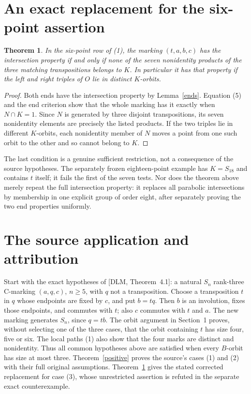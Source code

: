 \documentclass[a4paper,11pt]{article}
\newtheorem{theorem}{Theorem}\newtheorem{lemma}[theorem]{Lemma}
\begin{document}
\section{An exact replacement for the six-point assertion}
\begin{theorem}\label{six}
In the six-point row of (1), the marking $(t,a,b,c)$ has the
intersection property if and only if none of the seven nonidentity
products of the three matching transpositions belongs to $K$.
In particular it has that property if the left and right triples of $O$
lie in distinct $K$-orbits.
\end{theorem}
\begin{proof}
Both ends have the intersection property by Lemma~\ref{ends}.
Equation (5) and the end criterion show that the whole marking has it
exactly when $N\cap K=1$. Since $N$ is generated by three disjoint
transpositions, its seven nonidentity elements are precisely the listed
products. If the two triples lie in different $K$-orbits, each nonidentity
member of $N$ moves a point from one such orbit to the other and so cannot
belong to $K$.
\end{proof}

The last condition is a genuine sufficient restriction, not a consequence
of the source hypotheses. The separately frozen eighteen-point example
has $K=S_{18}$ and contains $t$ itself; it fails the first of the seven
tests. Nor does the theorem above merely repeat the full intersection
property: it replaces all parabolic intersections by membership in one
explicit group of order eight, after separately proving the two end
properties uniformly.

\section{The source application and attribution}
Start with the exact hypotheses of [DLM, Theorem~4.1]: a natural
$S_n$ rank-three C-marking $(a,q,c)$, $n\geq5$, with $q$ not a
transposition. Choose a transposition $t$ in $q$ whose endpoints are
fixed by $c$, and put $b=tq$. Then $b$ is an involution, fixes those
endpoints, and commutes with $t$; also $c$ commutes with $t$ and $a$.
The new marking generates $S_n$, since $q=tb$. The orbit argument in
Section~1 proves, without selecting one of the three cases, that the
orbit containing $t$ has size four, five or six. The local paths (1)
also show that the four marks are distinct and nonidentity. Thus all
common hypotheses above are satisfied when every $B$-orbit has size at
most three. Theorem~\ref{positive} proves the source's cases (1)
and (2) with their full original assumptions. Theorem~\ref{six} gives the
stated corrected replacement for case (3), whose unrestricted assertion
is refuted in the separate exact counterexample.
\end{document}

